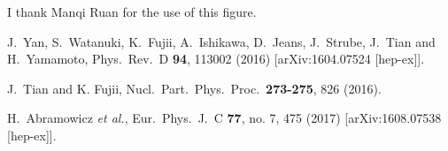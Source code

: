 \documentclass[12pt]{article}
\begin{document}
\begin{thebibliography}{99}
I thank Manqi Ruan for the use of this figure.


 J.~Yan, S.~Watanuki, K.~Fujii, A.~Ishikawa, D.~Jeans, J.~Strube, J.~Tian and H.~Yamamoto,
  Phys.\ Rev.\ D {\bf 94}, 113002 (2016)
  [arXiv:1604.07524 [hep-ex]].


 J.~Tian and K. Fujii,
  Nucl.\ Part.\ Phys.\ Proc.\  {\bf 273-275}, 826 (2016).

 H.~Abramowicz {\it et al.},
  Eur.\ Phys.\ J.\ C {\bf 77}, no. 7, 475 (2017)
  [arXiv:1608.07538 [hep-ex]].


\end{thebibliography}
\end{document}
